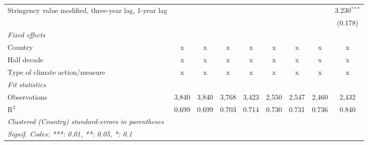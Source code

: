 \begin{table}[htbp]
\begin{tabular}{lcccccccc}
      Stringency value modified, three-year lag, 1-year lag                    &                &                &                &                &                &                &               & 3.230$^{***}$\\   
                                                                               &                &                &                &                &                &                &               & (0.178)\\   
      \emph{Fixed effects}\\
      Country                                                                  & x              & x              & x              & x              & x              & x              & x             & x\\  
      Half decade                                                              & x              & x              & x              & x              & x              & x              & x             & x\\  
      Type of climate action/measure                                           & x              & x              & x              & x              & x              & x              & x             & x\\  
      \midrule \emph{Fit statistics}\\
      Observations                                                             & 3,840          & 3,840          & 3,768          & 3,423          & 2,550          & 2,547          & 2,460         & 2,432\\  
      R$^2$                                                                    & 0.699          & 0.699          & 0.703          & 0.714          & 0.730          & 0.731          & 0.736         & 0.840\\  
      \midrule
      \multicolumn{9}{l}{\emph{Clustered (Country) standard-errors in parentheses}}\\
      \multicolumn{9}{l}{\emph{Signif. Codes: ***: 0.01, **: 0.05, *: 0.1}}\\
   \end{tabular}
\end{table}


